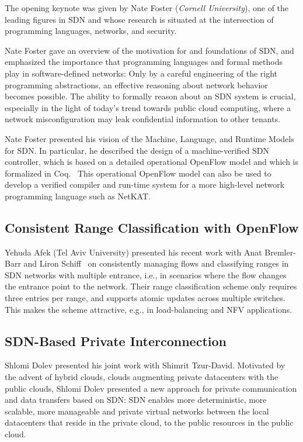 \documentclass[11pt,pdftex,letter]{article}
\begin{document}
The opening keynote was given by Nate Foster (\emph{Cornell University}),
one of the leading figures in SDN and whose research
is situated at the intersection of programming languages, networks, and security.

Nate Foster gave an overview of the motivation for and foundations of SDN, and
emphasized the importance that programming languages and formal methods
play in software-defined networks: Only by a careful engineering of the right programming abstractions,
an effective reasoning about network behavior becomes possible. The ability to
formally reason about an SDN system is crucial, especially in the light
of today's trend towards public cloud computing, where a network misconfiguration may
leak confidential information to other tenants.

Nate Foster presented his vision of the Machine, Language, and Runtime Models for SDN.
In particular, he described the design of a machine-verified SDN controller,
which is based on a detailed operational OpenFlow model
and which is formalized in Coq.~\cite{machine-verified}
This operational OpenFlow model can also be used
to develop a verified compiler and run-time system
for a more high-level network programming language such as NetKAT.~\cite{netkat}


\subsection{Consistent Range Classification with OpenFlow}

Yehuda Afek (Tel Aviv University) presented his recent work with Anat Bremler-Barr and
Liron Schiff~\cite{AfekBS14} on consistently managing flows and classifying ranges
in SDN networks with multiple entrance, i.e., in scenarios where the flow changes the entrance point
to the network.
Their range classification scheme only requires three entries per range,
and supports atomic updates across multiple switches. This makes the scheme attractive,
e.g., in load-balancing and NFV applications.


\subsection{SDN-Based Private Interconnection}

Shlomi Dolev presented his joint work with Shimrit Tzur-David. 
Motivated by the advent of hybrid clouds, clouds augmenting 
private datacenters with the public clouds, Shlomi Dolev
presented a new approach for private communication and data transfers
based on SDN: SDN enables more deterministic, more scalable, more manageable and private virtual
networks between the local datacenters that reside in the private cloud, to the public resources in the public cloud. 
\end{document}
